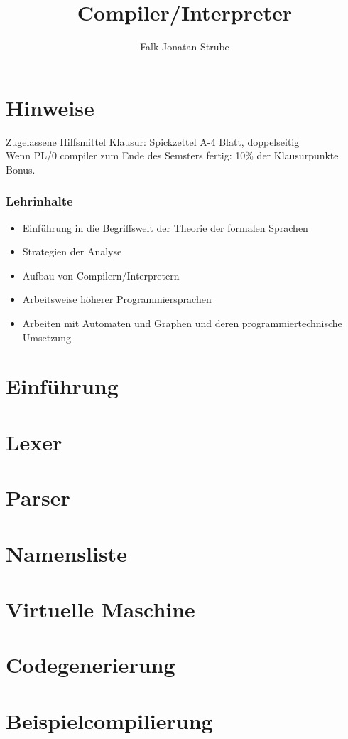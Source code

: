 \documentclass{scrreprt}
\title{Compiler/Interpreter}
\author{Falk-Jonatan Strube}
\begin{document}
\maketitle
\tableofcontents

\chapter*{Hinweise}

Zugelassene Hilfsmittel Klausur: Spickzettel A-4 Blatt, doppelseitig\\
Wenn PL/0 compiler zum Ende des Semsters fertig: 10\% der Klausurpunkte Bonus.

\subsection*{Lehrinhalte}
\begin{itemize}
\item Einführung in die Begriffswelt der Theorie der formalen Sprachen
\item Strategien der Analyse
\item Aufbau von Compilern/Interpretern
\item Arbeitsweise höherer Programmiersprachen
\item Arbeiten mit Automaten und Graphen und deren programmiertechnische Umsetzung
\end{itemize}

\chapter{Einführung}


%

\chapter{Lexer}


\chapter{Parser}


\chapter{Namensliste}


\chapter{Virtuelle Maschine}


\chapter{Codegenerierung}


\chapter{Beispielcompilierung}

\end{document}
